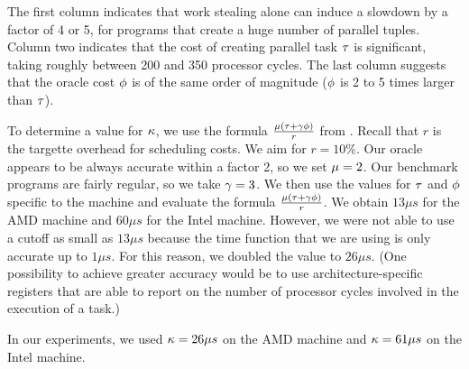 The first column indicates that work stealing alone can induce
a slowdown by a factor of 4 or 5, for programs that create a
huge number of parallel tuples. 
Column two indicates that the cost of creating parallel task ${\tau}$ 
is significant, taking roughly between 200 and 350 processor cycles. 
The last column suggests that the oracle cost ${\phi}$
is of the same order of magnitude (${\phi}$ is 2 to 5 times larger than ${\tau}$).

To determine a value for ${\kappa}$, we use the formula
$\frac{{\mu}({\tau}+{\gamma}{\phi})}{r}$ from .  Recall
that $r$ is the targette overhead for scheduling costs.  We aim for $r =
10\%$.  Our oracle appears to be always accurate within a factor 2, so
we set ${\mu} = 2$.  Our benchmark programs are fairly regular, so we
take ${\gamma} = 3$.  We then use the values for ${\tau}$ and ${\phi}$
specific to the machine and evaluate the formula
$\frac{{\mu}({\tau}+{\gamma}{\phi})}{r}$.  We obtain $13\mu s$ for the AMD
machine and $60\mu s$ for the Intel machine.  However, we were not able to
use a cutoff as small as $13\mu s$ because the time function that we
are using is only accurate up to $1\mu s$.  For this reason, we
doubled the value to $26\mu s$.  (One possibility to achieve greater
accuracy would be to use architecture-specific registers that are able
to report on the number of processor cycles involved in the execution
of a task.)

In our experiments, we used ${\kappa} = 26\mu s$ on the AMD machine and ${\kappa} = 61\mu s$ on the Intel machine.


